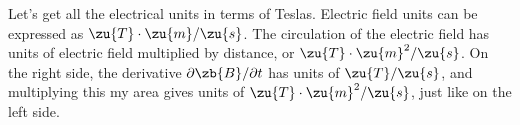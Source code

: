 Let's get all the electrical units in terms of Teslas. Electric field
units can be expressed as $\zu{T}\cdot\zu{m}/\zu{s}$. The circulation
of the electric field has units of electric field multiplied by
distance, or $\zu{T}\cdot\zu{m}^2/\zu{s}$. On the right side, the
derivative $\partial\zb{B}/\partial t$ has units of $\zu{T}/\zu{s}$,
and multiplying this my area gives units of
$\zu{T}\cdot\zu{m}^2/\zu{s}$, just like on the left side.
